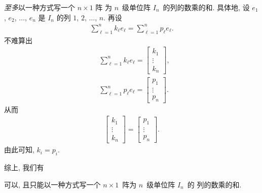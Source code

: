 \emph{至多}以一种方式写一个 \(n \times 1\) 阵%
为 \(n\)~级单位阵 \(I_n\)~的列的数乘的和.
具体地, 设 \(e_1\), \(e_2\), \(\dots\), \(e_n\) 是
\(I_n\) 的列 \(1\), \(2\), \(\dots\), \(n\).
再设
\begin{align*}
    \sum_{\ell = 1}^{n} {k_\ell e_\ell}
    = \sum_{\ell = 1}^{n} {p_\ell e_\ell}.
\end{align*}
不难算出
\begin{align*}
     & \sum_{\ell = 1}^{n} {k_\ell e_\ell}
    = \begin{bmatrix}
          k_1    \\
          \vdots \\
          k_n
      \end{bmatrix},                       \\
     & \sum_{\ell = 1}^{n} {p_\ell e_\ell}
    = \begin{bmatrix}
          p_1    \\
          \vdots \\
          p_n
      \end{bmatrix}.
\end{align*}
从而
\begin{align*}
    \begin{bmatrix}
        k_1    \\
        \vdots \\
        k_n
    \end{bmatrix}
    = \begin{bmatrix}
          p_1    \\
          \vdots \\
          p_n
      \end{bmatrix}.
\end{align*}
由此可知, \(k_i = p_i\).

综上, 我们有

\begin{theorem}
    可以, 且只能以一种方式写一个
    \(n \times 1\)~阵为 \(n\)~级单位阵 \(I_n\)~的%
    列的数乘的和.
\end{theorem}

